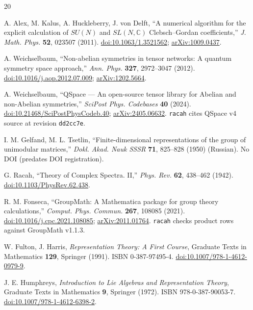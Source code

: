 \documentclass[11pt,a4paper]{article}
\theoremstyle{plain}
\theoremstyle{definition}
\newcommand{\CC}{\mathbb{C}}
\newcommand{\code}[1]{\texttt{#1}}
\begin{document}
\begin{thebibliography}{20}

 A. Alex, M. Kalus, A. Huckleberry, J. von Delft,
``A numerical algorithm for the explicit calculation of $SU(N)$ and
$SL(N,\CC)$ Clebsch--Gordan coefficients,''
\emph{J. Math. Phys.} \textbf{52}, 023507 (2011).
\href{https://doi.org/10.1063/1.3521562}{doi:10.1063/1.3521562};
\href{https://arxiv.org/abs/1009.0437}{arXiv:1009.0437}.

 A. Weichselbaum,
``Non-abelian symmetries in tensor networks: A quantum symmetry space
approach,'' \emph{Ann. Phys.} \textbf{327}, 2972--3047 (2012).
\href{https://doi.org/10.1016/j.aop.2012.07.009}{doi:10.1016/j.aop.2012.07.009};
\href{https://arxiv.org/abs/1202.5664}{arXiv:1202.5664}.

 A. Weichselbaum,
``QSpace --- An open-source tensor library for Abelian and non-Abelian
symmetries,'' \emph{SciPost Phys. Codebases} \textbf{40} (2024).
\href{https://doi.org/10.21468/SciPostPhysCodeb.40}{doi:10.21468/SciPostPhysCodeb.40};
\href{https://arxiv.org/abs/2405.06632}{arXiv:2405.06632}.
\code{racah} cites QSpace v4 source at revision \code{dd2cc7e}.

 I. M. Gelfand, M. L. Tsetlin,
``Finite-dimensional representations of the group of unimodular matrices,''
\emph{Dokl. Akad. Nauk SSSR} \textbf{71}, 825--828 (1950) (Russian).
No DOI (predates DOI registration).

 G. Racah, ``Theory of Complex Spectra. II,''
\emph{Phys. Rev.} \textbf{62}, 438--462 (1942).
\href{https://doi.org/10.1103/PhysRev.62.438}{doi:10.1103/PhysRev.62.438}.

 R. M. Fonseca,
``GroupMath: A Mathematica package for group theory calculations,''
\emph{Comput. Phys. Commun.} \textbf{267}, 108085 (2021).
\href{https://doi.org/10.1016/j.cpc.2021.108085}{doi:10.1016/j.cpc.2021.108085};
\href{https://arxiv.org/abs/2011.01764}{arXiv:2011.01764}.
\code{racah} checks product rows against GroupMath v1.1.3.

 W. Fulton, J. Harris,
\emph{Representation Theory: A First Course},
Graduate Texts in Mathematics \textbf{129}, Springer (1991).
ISBN 0-387-97495-4.
\href{https://doi.org/10.1007/978-1-4612-0979-9}{doi:10.1007/978-1-4612-0979-9}.

 J. E. Humphreys,
\emph{Introduction to Lie Algebras and Representation Theory},
Graduate Texts in Mathematics \textbf{9}, Springer (1972).
ISBN 978-0-387-90053-7.
\href{https://doi.org/10.1007/978-1-4612-6398-2}{doi:10.1007/978-1-4612-6398-2}.


\end{thebibliography}
\end{document}
